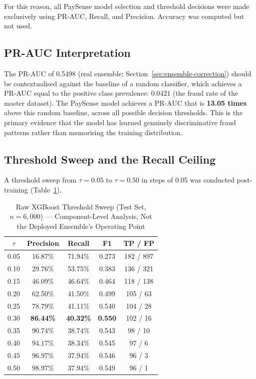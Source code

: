 \documentclass[conference]{IEEEtran}
\begin{document}
For this reason, all PaySense model selection and threshold decisions were
made exclusively using PR-AUC, Recall, and Precision. Accuracy was
computed but not used.

\subsection{PR-AUC Interpretation}

The PR-AUC of 0.5498 (real ensemble; Section~\ref{sec:ensemble-correction})
should be contextualised against the baseline of a
random classifier, which achieves a PR-AUC equal to the positive class
prevalence: $0.0421$ (the fraud rate of the master dataset). The PaySense
model achieves a PR-AUC that is \textbf{13.05 times} above this random
baseline, across all possible decision thresholds. This is the primary
evidence that the model has learned genuinely discriminative fraud patterns
rather than memorising the training distribution.

\subsection{Threshold Sweep and the Recall Ceiling}

A threshold sweep from $\tau = 0.05$ to $\tau = 0.50$ in steps of 0.05
was conducted post-training (Table~\ref{tab:threshold_sweep}).

\begin{table}[H]
\centering
\caption{Raw XGBoost Threshold Sweep (Test Set, $n = 6{,}000$) --- Component-Level Analysis, Not the Deployed Ensemble's Operating Point}
\label{tab:threshold_sweep}
\begin{tabular}{@{}ccccc@{}}
\toprule
$\tau$ & Precision & Recall & F1 & TP / FP \\
\midrule
0.05 & 16.87\% & 71.94\% & 0.273 & 182 / 897 \\
0.10 & 29.76\% & 53.75\% & 0.383 & 136 / 321 \\
0.15 & 46.09\% & 46.64\% & 0.464 & 118 / 138 \\
0.20 & 62.50\% & 41.50\% & 0.499 & 105 / 63  \\
0.25 & 78.79\% & 41.11\% & 0.540 & 104 / 28  \\
0.30 & \textbf{86.44\%} & \textbf{40.32\%} & \textbf{0.550} & 102 / 16  \\
0.35 & 90.74\% & 38.74\% & 0.543 & 98  / 10  \\
0.40 & 94.17\% & 38.34\% & 0.545 & 97  / 6   \\
0.45 & 96.97\% & 37.94\% & 0.546 & 96  / 3   \\
0.50 & 98.97\% & 37.94\% & 0.549 & 96  / 1   \\
\bottomrule
\end{tabular}
\end{table}
\end{document}
